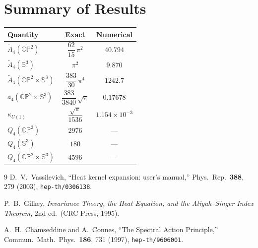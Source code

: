 \documentclass[11pt]{article}
\newcommand{\CP}{\mathbb{CP}}
\newcommand{\Sph}{\mathbb{S}}
\begin{document}
\section{Summary of Results}

\begin{center}
\renewcommand{\arraystretch}{1.3}
\begin{tabular}{lcc}
\toprule
Quantity & Exact & Numerical \\
\midrule
$\widetilde{A}_4(\CP^2)$ & $\dfrac{62}{15}\,\pi^2$ & $40.794$ \\[6pt]
$\widetilde{A}_4(\Sph^3)$ & $\pi^2$ & $9.870$ \\[6pt]
$\widetilde{A}_4(\CP^2 {\times} \Sph^3)$ & $\dfrac{383}{30}\,\pi^4$ & $1242.7$ \\[6pt]
$a_4(\CP^2 {\times} \Sph^3)$ & $\dfrac{383}{3840}\,\sqrt{\pi}$ & $0.17678$ \\[6pt]
$\kappa_{U(1)}$ & $\dfrac{\sqrt{\pi}}{1536}$ & $1.154 \times 10^{-3}$ \\[6pt]
$Q_4(\CP^2)$ & $2976$ & --- \\
$Q_4(\Sph^3)$ & $180$ & --- \\
$Q_4(\CP^2 {\times} \Sph^3)$ & $4596$ & --- \\
\bottomrule
\end{tabular}
\end{center}

\begin{thebibliography}{9}
  D.~V.~Vassilevich,
  ``Heat kernel expansion: user's manual,''
  Phys.\ Rep.\ \textbf{388}, 279 (2003),
  \texttt{hep-th/0306138}.

  P.~B.~Gilkey,
  \textit{Invariance Theory, the Heat Equation, and the
  Atiyah--Singer Index Theorem}, 2nd ed.\ (CRC Press, 1995).

  A.~H.~Chamseddine and A.~Connes,
  ``The Spectral Action Principle,''
  Commun.\ Math.\ Phys.\ \textbf{186}, 731 (1997),
  \texttt{hep-th/9606001}.
\end{thebibliography}
\end{document}

